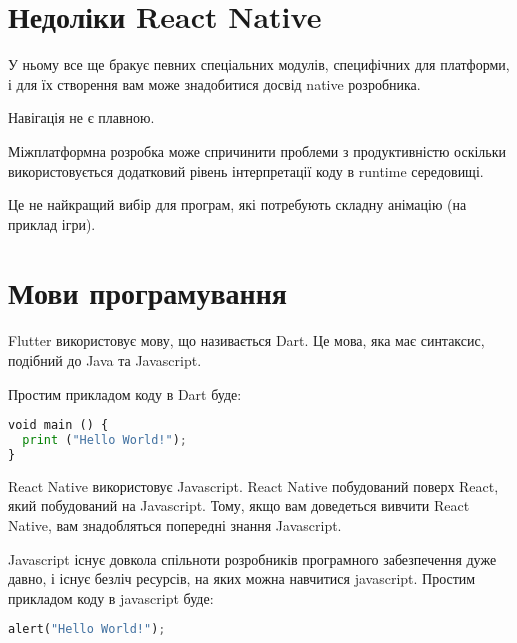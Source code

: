 \section{Недоліки React Native}
\label{sec:rn_cons}
\begin{enumerate}
    \begin{item}
        У ньому все ще бракує певних спеціальних модулів, специфічних для платформи, і для їх створення вам може знадобитися досвід native розробника.
    \end{item}
    \begin{item}
        Навігація не є плавною.
    \end{item}
    \begin{item}
        Міжплатформна розробка може спричинити проблеми з продуктивністю оскільки використовується додатковий рівень інтерпретації коду в runtime середовищі.
    \end{item}
    \begin{item}
        Це не найкращий вибір для програм, які потребують складну анімацію (на приклад ігри).
    \end{item}
\end{enumerate}


\section{Мови програмування}
\label{sec:languages}

Flutter використовує мову, що називається Dart.
Це мова, яка має синтаксис, подібний до Java та Javascript.

Простим прикладом коду в Dart буде:
\begin{lstlisting}[style=light, language=Python,label={lst:vectorimg},caption=Dart Hello World]
void main () { 
  print ("Hello World!"); 
}
\end{lstlisting}

React Native використовує Javascript.
React Native побудований поверх React, який побудований на Javascript.
Тому, якщо вам доведеться вивчити React Native, вам знадобляться попередні знання Javascript.

Javascript існує довкола спільноти розробників програмного забезпечення дуже давно, і існує безліч ресурсів, на яких можна навчитися javascript.
Простим прикладом коду в javascript буде:

\begin{lstlisting}[style=light, language=Python,label={lst:vectorimg},caption=Dart Hello World]
  alert("Hello World!");
\end{lstlisting}


